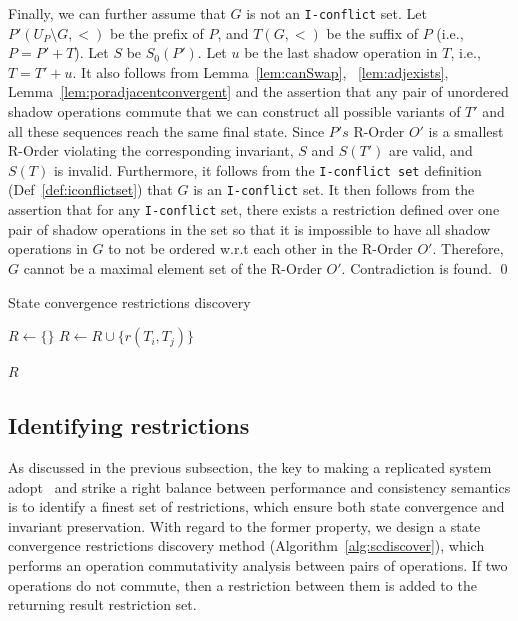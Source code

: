 {Finally, we can further assume that $G$ is not an {\tt I-conflict} set.
Let $P'(U_P\setminus G, <)$ be the prefix of $P$, and $T(G, <)$ be the suffix of $P$ (i.e.,
$P = P' + T$). Let $S$ be $S_0(P')$. Let $u$ be the last shadow operation in $T$, i.e., $T = T' + u$.
It also follows from Lemma~\ref{lem:canSwap}, ~\ref{lem:adjexists},
Lemma~\ref{lem:poradjacentconvergent} and the assertion that any pair of unordered shadow operations commute that
we can construct all possible variants of $T'$ and all these sequences reach the same final state.
 Since $P's$ R-Order $O'$ is a smallest R-Order violating the corresponding invariant,
$S$ and $S(T')$ are valid, and $S(T)$ is invalid. Furthermore, it follows from the {\tt I-conflict set} 
definition (Def~\ref{def:iconflictset}) that $G$ is an {\tt I-conflict} set. It then follows from the assertion that 
for any {\tt I-conflict} set, there exists a restriction defined
over one pair of shadow operations in the set so that it is impossible to have all shadow operations in $G$
to not be ordered w.r.t each other in the R-Order $O'$. Therefore, $G$ cannot be a maximal element set of the R-Order $O'$. Contradiction is found.
\qed
}{}

\begin{algorithm}[th!]
\caption{State convergence restrictions discovery}
\label{alg:scdiscover}
\begin{algorithmic}[1]
\State $R \leftarrow \{ \}$ 
     \State $R \leftarrow R \cup \{r(T_i, T_j)\}$
    \EndIf
 \EndFor
\EndFor

\Return $R$
\EndFunction
\end{algorithmic}
\end{algorithm}

\subsection{Identifying restrictions}
\label{ch:por:sect:identify}
As discussed in the previous subsection, the key to making a replicated system
adopt \PRCN\ and strike a right balance between performance and consistency semantics
is to identify a finest set of restrictions, which ensure both state convergence
and invariant preservation. With regard to the former property, we design a state convergence
restrictions discovery method (Algorithm~\ref{alg:scdiscover}), which
performs an operation commutativity analysis between pairs of operations. If
two operations do not commute, then a restriction between them is added to the returning
result restriction set.

